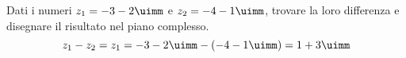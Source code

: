  	Dati i numeri $z_1=-3-2\uimm$ e $z_2=-4-1\uimm$, trovare la loro differenza e  disegnare il risultato  nel piano complesso.
 	\[z_1-z_2=z_1=-3-2\uimm-(-4-1\uimm) =1+3\uimm \]
 	\begin{center}
 		
 		\label{fig:disegnopianocomplesso09}
 	\end{center}
 
